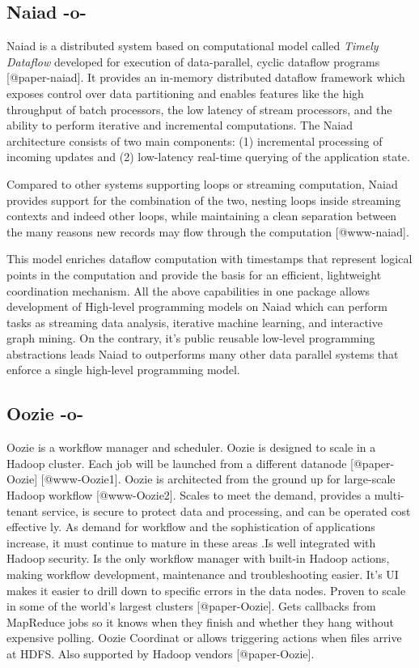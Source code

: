     
\subsection{Naiad -o-}

Naiad is a distributed system based on computational model called
\textit{Timely Dataflow} developed for execution of data-parallel,
cyclic dataflow programs [@paper-naiad].  It provides an in-memory
distributed dataflow framework which exposes control over data
partitioning and enables features like the high throughput of batch
processors, the low latency of stream processors, and the ability to
perform iterative and incremental computations. The Naiad architecture
consists of two main components: (1) incremental processing of
incoming updates and (2) low-latency real-time querying of the
application state.
    
Compared to other systems supporting loops or streaming computation,
Naiad provides support for the combination of the two, nesting loops
inside streaming contexts and indeed other loops, while maintaining a
clean separation between the many reasons new records may flow through
the computation [@www-naiad].
    
This model enriches dataflow computation with timestamps that
represent logical points in the computation and provide the basis for
an efficient, lightweight coordination mechanism.  All the above
capabilities in one package allows development of High-level
programming models on Naiad which can perform tasks as streaming data
analysis, iterative machine learning, and interactive graph mining. On
the contrary, it's public reusable low-level programming abstractions
leads Naiad to outperforms many other data parallel systems that
enforce a single high-level programming model.


    
\subsection{Oozie -o-}

Oozie is a workflow manager and scheduler. Oozie is designed to scale
in a Hadoop cluster. Each job will be launched from a different
datanode [@paper-Oozie] [@www-Oozie1]. Oozie is architected
from the ground up for large-scale Hadoop workflow [@www-Oozie2].
Scales to meet the demand, provides a multi-tenant service, is secure
to protect data and processing, and can be operated cost effective
ly. As demand for workflow and the sophistication of applications
increase, it must continue to mature in these areas
\cite{paper-Oozie}.Is well integrated with Hadoop security. Is the
only workflow manager with built-in Hadoop actions, making workflow
development, maintenance and troubleshooting easier. It's UI makes it
easier to drill down to specific errors in the data nodes. Proven to
scale in some of the world's largest clusters [@paper-Oozie]. Gets
callbacks from MapReduce jobs so it knows when they finish and whether
they hang without expensive polling. Oozie Coordinat or allows
triggering actions when files arrive at HDFS. Also supported by Hadoop
vendors [@paper-Oozie].





